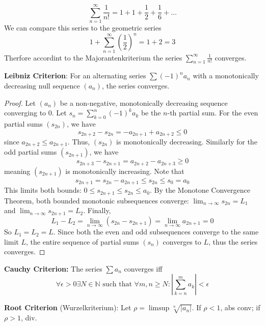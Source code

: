 \begin{example}
    $$\sum_{n=1}^\infty \frac{1}{n!} = 1 + 1 + \frac{1}{2} + \frac{1}{6} + \dots$$
    We can compare this series to the geometric series 
    $$1 +\sum_{n=1}^\infty (\frac{1}{2})^n = 1 + 2 = 3$$
    Therfore accordint to the Majorantenkriterium the series $\sum_{n=1}^\infty \frac{1}{n!}$ converges.
\end{example}


\begin{theorem}
    \textbf{Leibniz Criterion}: For an alternating series $\sum (-1)^n a_n$ with a monotonically decreasing null sequence $(a_n)$, the series converges.
\end{theorem}

\begin{proof}
    Let $(a_n)$ be a non-negative, monotonically decreasing sequence converging to $0$. Let $s_n = \sum_{k=0}^n (-1)^k a_k$ be the $n$-th partial sum.
    For the even partial sums $(s_{2n})$, we have 
    $$s_{2n+2} - s_{2n} = -a_{2n+1} + a_{2n+2} \le 0$$ 
    since $a_{2n+2} \le a_{2n+1}$. Thus, $(s_{2n})$ is monotonically decreasing. Similarly for the odd partial sums $(s_{2n+1})$, we have 
    $$s_{2n+3} - s_{2n+1} = a_{2n+2} - a_{2n+3} \ge 0$$
    meaning $(s_{2n+1})$ is monotonically increasing.
    Note that 
    $$s_{2n+1} = s_{2n} - a_{2n+1} \le s_{2n} \le s_0 = a_0$$
    This limits both bounds: $0 \le s_{2n+1} \le s_{2n} \le a_0$.
    By the Monotone Convergence Theorem, both bounded monotonic subsequences converge: $\lim_{n\to\infty} s_{2n} = L_1$ and $\lim_{n\to\infty} s_{2n+1} = L_2$.
    Finally, 
    $$L_1 - L_2 = \lim_{n\to\infty} (s_{2n} - s_{2n+1}) = \lim_{n\to\infty} a_{2n+1} = 0$$
    So $L_1 = L_2 = L$. Since both the even and odd subsequences converge to the same limit $L$, the entire sequence of partial sums $(s_n)$ converges to $L$, thus the series converges.
\end{proof}

\begin{theorem}
\textbf{Cauchy Criterion:} The series $\sum a_n$ converges iff $$\forall \epsilon \gt 0 \exists N \in \mathbb{N} \text{ such that } \forall m, n \ge N : |\sum_{k=n}^m a_k| \lt \epsilon$$
\end{theorem}

\begin{theorem}
    \textbf{Root Criterion} (Wurzelkriterium): Let $\rho = \limsup \sqrt[n]{|a_n|}$. If $\rho \lt 1$, abs conv; if $\rho \gt 1$, div.
\end{theorem}

